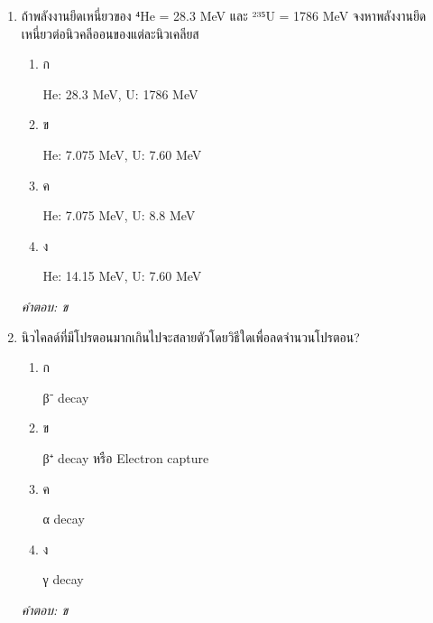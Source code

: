 \documentclass[12pt]{article}
\begin{document}
\begin{enumerate}[label=\arabic*., itemsep=0.5\baselineskip, topsep=0.5\baselineskip, leftmargin=*]
\item ถ้าพลังงานยึดเหนี่ยวของ ⁴He = 28.3 MeV และ ²³⁵U = 1786 MeV จงหาพลังงานยึดเหนี่ยวต่อนิวคลีออนของแต่ละนิวเคลียส
\begin{enumerate}[label=\alph*)., itemsep=0.3\baselineskip, topsep=0.3\baselineskip]
\item ก\ 
\begin{minipage}[t]{0.9\linewidth}
\raggedright He: 28.3 MeV, U: 1786 MeV
\end{minipage}
\item ข\ 
\begin{minipage}[t]{0.9\linewidth}
\raggedright He: 7.075 MeV, U: 7.60 MeV
\end{minipage}
\item ค\ 
\begin{minipage}[t]{0.9\linewidth}
\raggedright He: 7.075 MeV, U: 8.8 MeV
\end{minipage}
\item ง\ 
\begin{minipage}[t]{0.9\linewidth}
\raggedright He: 14.15 MeV, U: 7.60 MeV
\end{minipage}
\end{enumerate}
\vspace{-0.3\baselineskip}
\begin{small}
\textit{คำตอบ: ข}
\end{small}

\item นิวไคลด์ที่มีโปรตอนมากเกินไปจะสลายตัวโดยวิธีใดเพื่อลดจำนวนโปรตอน?
\begin{enumerate}[label=\alph*)., itemsep=0.3\baselineskip, topsep=0.3\baselineskip]
\item ก\ 
\begin{minipage}[t]{0.9\linewidth}
\raggedright β⁻ decay
\end{minipage}
\item ข\ 
\begin{minipage}[t]{0.9\linewidth}
\raggedright β⁺ decay หรือ Electron capture
\end{minipage}
\item ค\ 
\begin{minipage}[t]{0.9\linewidth}
\raggedright α decay
\end{minipage}
\item ง\ 
\begin{minipage}[t]{0.9\linewidth}
\raggedright γ decay
\end{minipage}
\end{enumerate}
\vspace{-0.3\baselineskip}
\begin{small}
\textit{คำตอบ: ข}
\end{small}


\end{enumerate}
\end{document}
